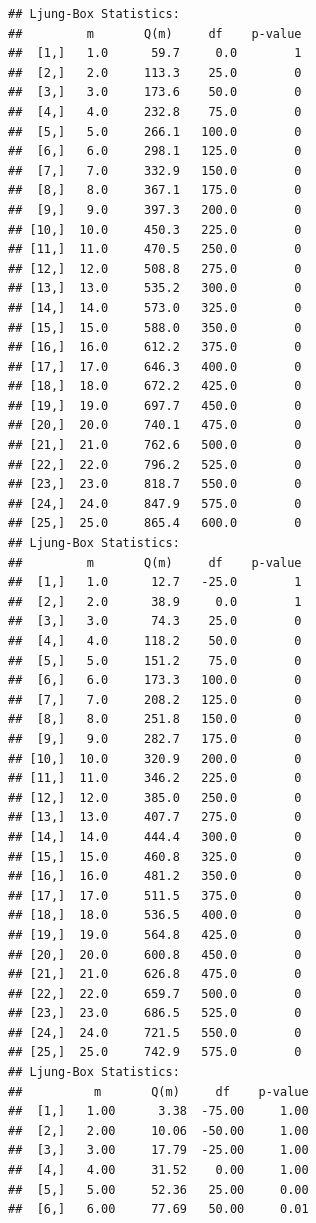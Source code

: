 \documentclass[12pt,a4paper]{article}
\begin{document}
\begin{verbatim}
## Ljung-Box Statistics:  
##         m       Q(m)     df    p-value
##  [1,]   1.0      59.7     0.0        1
##  [2,]   2.0     113.3    25.0        0
##  [3,]   3.0     173.6    50.0        0
##  [4,]   4.0     232.8    75.0        0
##  [5,]   5.0     266.1   100.0        0
##  [6,]   6.0     298.1   125.0        0
##  [7,]   7.0     332.9   150.0        0
##  [8,]   8.0     367.1   175.0        0
##  [9,]   9.0     397.3   200.0        0
## [10,]  10.0     450.3   225.0        0
## [11,]  11.0     470.5   250.0        0
## [12,]  12.0     508.8   275.0        0
## [13,]  13.0     535.2   300.0        0
## [14,]  14.0     573.0   325.0        0
## [15,]  15.0     588.0   350.0        0
## [16,]  16.0     612.2   375.0        0
## [17,]  17.0     646.3   400.0        0
## [18,]  18.0     672.2   425.0        0
## [19,]  19.0     697.7   450.0        0
## [20,]  20.0     740.1   475.0        0
## [21,]  21.0     762.6   500.0        0
## [22,]  22.0     796.2   525.0        0
## [23,]  23.0     818.7   550.0        0
## [24,]  24.0     847.9   575.0        0
## [25,]  25.0     865.4   600.0        0
## Ljung-Box Statistics:  
##         m       Q(m)     df    p-value
##  [1,]   1.0      12.7   -25.0        1
##  [2,]   2.0      38.9     0.0        1
##  [3,]   3.0      74.3    25.0        0
##  [4,]   4.0     118.2    50.0        0
##  [5,]   5.0     151.2    75.0        0
##  [6,]   6.0     173.3   100.0        0
##  [7,]   7.0     208.2   125.0        0
##  [8,]   8.0     251.8   150.0        0
##  [9,]   9.0     282.7   175.0        0
## [10,]  10.0     320.9   200.0        0
## [11,]  11.0     346.2   225.0        0
## [12,]  12.0     385.0   250.0        0
## [13,]  13.0     407.7   275.0        0
## [14,]  14.0     444.4   300.0        0
## [15,]  15.0     460.8   325.0        0
## [16,]  16.0     481.2   350.0        0
## [17,]  17.0     511.5   375.0        0
## [18,]  18.0     536.5   400.0        0
## [19,]  19.0     564.8   425.0        0
## [20,]  20.0     600.8   450.0        0
## [21,]  21.0     626.8   475.0        0
## [22,]  22.0     659.7   500.0        0
## [23,]  23.0     686.5   525.0        0
## [24,]  24.0     721.5   550.0        0
## [25,]  25.0     742.9   575.0        0
## Ljung-Box Statistics:  
##          m       Q(m)     df    p-value
##  [1,]   1.00      3.38  -75.00     1.00
##  [2,]   2.00     10.06  -50.00     1.00
##  [3,]   3.00     17.79  -25.00     1.00
##  [4,]   4.00     31.52    0.00     1.00
##  [5,]   5.00     52.36   25.00     0.00
##  [6,]   6.00     77.69   50.00     0.01

\end{verbatim}
\end{document}

